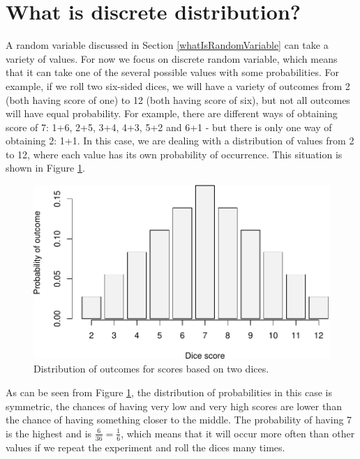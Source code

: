 \documentclass[
]{book}
\theoremstyle{definition}
\theoremstyle{definition}
\theoremstyle{definition}
\theoremstyle{definition}
\theoremstyle{remark}
\begin{document}
\section{What is discrete distribution?}\label{what-is-discrete-distribution}

A random variable discussed in Section \ref{whatIsRandomVariable} can take a variety of values. For now we focus on discrete random variable, which means that it can take one of the several possible values with some probabilities. For example, if we roll two six-sided dices, we will have a variety of outcomes from 2 (both having score of one) to 12 (both having score of six), but not all outcomes will have equal probability. For example, there are different ways of obtaining score of 7: 1+6, 2+5, 3+4, 4+3, 5+2 and 6+1 - but there is only one way of obtaining 2: 1+1. In this case, we are dealing with a distribution of values from 2 to 12, where each value has its own probability of occurrence. This situation is shown in Figure \ref{fig:distributionDice12}.

\begin{figure}
\centering
\includegraphics{Svetunkov---Statistics-for-Business-Analytics_files/figure-latex/distributionDice12-1.pdf}
\caption{\label{fig:distributionDice12}Distribution of outcomes for scores based on two dices.}
\end{figure}

As can be seen from Figure \ref{fig:distributionDice12}, the distribution of probabilities in this case is symmetric, the chances of having very low and very high scores are lower than the chance of having something closer to the middle. The probability of having 7 is the highest and is \(\frac{6}{36}=\frac{1}{6}\), which means that it will occur more often than other values if we repeat the experiment and roll the dices many times.
\end{document}
